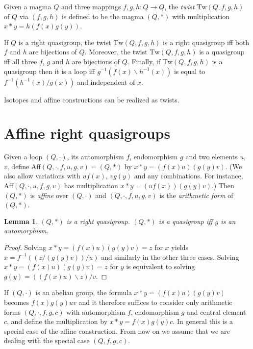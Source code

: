\documentclass{amsart}
\def\rdiv{/}
\def\ldiv{\backslash}
\theoremstyle{plain}
\newtheorem{lemma}[theorem]{Lemma}
\theoremstyle{definition}
\begin{document}
Given a magma $Q$ and three mappings $f,g,h:Q\to Q$, the \emph{twist} $\mathrm{Tw}(Q,f,g,h)$ of $Q$ via $(f,g,h)$ is defined to be the magma $(Q,*)$ with multiplication $x*y = h(f(x)g(y))$.

If $Q$ is a right quasigroup, the twist $\mathrm{Tw}(Q,f,g,h)$ is a right quasigroup iff both $f$ and $h$ are bijections of $Q$. Moreover, the twist $\mathrm{Tw}(Q,f,g,h)$ is a quasigroup iff all three $f$, $g$ and $h$ are bijections of $Q$. Finally, if $\mathrm{Tw}(Q,f,g,h)$ is a quasigroup then it is a loop iff $g^{-1}(f(x)\backslash h^{-1}(x))$ is equal to $f^{-1}(h^{-1}(x)/g(x))$ and independent of $x$.

Isotopes and affine constructions can be realized as twists.

\section{Affine right quasigroups}

Given a loop $(Q,\cdot)$, its automorphism $f$, endomorphism $g$ and two elements $u$, $v$, define $\mathrm{Aff}(Q,\cdot,f,u,g,v)=(Q,*)$ by $x*y = (f(x)u)(g(y)v)$. (We also allow variations with $uf(x)$, $vg(y)$ and any combinations. For instance, $\mathrm{Aff}(Q,\cdot,u,f,g,v)$ has multiplication $x*y = (uf(x))(g(y)v)$.) Then $(Q,*)$ is \emph{affine} over $(Q,\cdot)$ and $(Q,\cdot,f,u,g,v)$ is the \emph{arithmetic form} of $(Q,*)$.

\begin{lemma}
$(Q,*)$ is a right quasigroup. $(Q,*)$ is a quasigroup iff $g$ is an automorphism.
\end{lemma}
\begin{proof}
Solving $x*y = (f(x)u)(g(y)v)=z$ for $x$ yields $x = f^{-1}((z/(g(y)v))/u)$ and similarly in the other three cases. Solving $x*y=(f(x)u)(g(y)v)=z$ for $y$ is equivalent to solving $g(y) = ((f(x)u)\ldiv z)\rdiv v$.
\end{proof}

If $(Q,\cdot)$ is an abelian group, the formula $x*y = (f(x)u)(g(y)v)$ becomes $f(x)g(y)uv$ and it therefore suffices to consider only arithmetic forms $(Q,\cdot,f,g,c)$ with automorphism $f$, endomorphism $g$ and central element $c$, and define the multiplication by $x*y =f(x)g(y)c$. In general this is a special case of the affine construction. From now on we assume that we are dealing with the special case $(Q,f,g,c)$.
\end{document}
